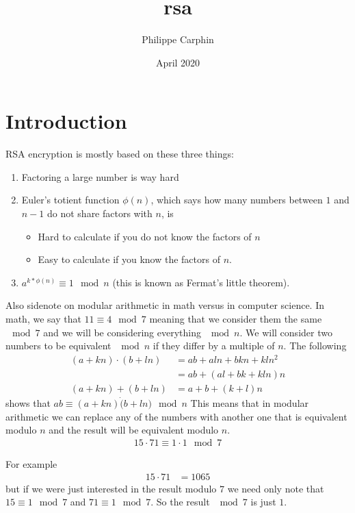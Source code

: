 \documentclass{article} \usepackage{amsmath} \usepackage[utf8]{inputenc}
\title{rsa} \author{Philippe Carphin} \date{April 2020}
\begin{document}
\maketitle

\section{Introduction}
RSA encryption is mostly based on these three things:
\begin{enumerate}


\item Factoring a large number is way hard
\item Euler's totient function $\phi(n)$, which says how many numbers between
  $1$ and $n-1$ do not share factors with $n$, is
\begin{itemize}
    \item Hard to calculate if you do not know the factors of $n$
    \item Easy to calculate if you know the factors of $n$.
\end{itemize}
\item $a^{k*\phi(n)} \equiv 1 \mod{n}$ (this is known as Fermat's little
  theorem).

\end{enumerate}
Also sidenote on modular arithmetic in math versus in computer science. In math,
we say that $11 \equiv 4 \mod{7}$ meaning that we consider them the same
$\mod{7}$ and we will be considering everything $\mod{n}$. We will consider two
numbers to be equivalent $\mod{n}$ if they differ by a multiple of $n$. The
following
\begin{align}
    (a + kn) \cdot (b + ln) &= ab + aln + bkn + kln^2 \\ &= ab + (al + bk +
  kln)n \\ (a + kn) + (b + ln) &= a + b + (k+l)n
\end{align}
shows that $ab \equiv (a+kn)\dot(b+ln) \mod{n}$ This means that in modular
arithmetic we can replace any of the numbers with another one that is equivalent
modulo $n$ and the result will be equivalent modulo $n$.
\begin{align}
    15 \cdot 71 \equiv 1 \cdot 1 \mod{7}
\end{align}

For example
\begin{align}
    15 \cdot 71 &= 1065
\end{align}
but if we were just interested in the result modulo $7$ we need only note that
$15 \equiv 1 \mod{7}$ and $71 \equiv 1 \mod{7}$. So the result $\mod{7}$ is just
$1$.
\end{document}
